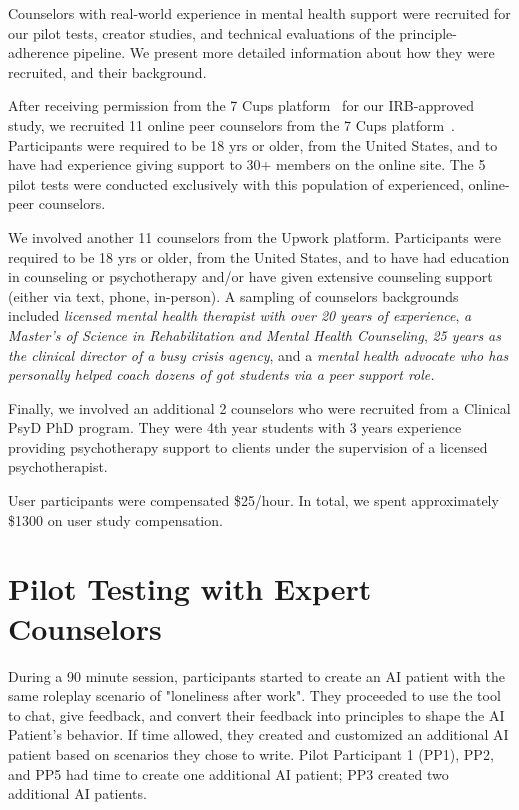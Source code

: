 \documentclass[11pt]{article}
\begin{document}
Counselors with real-world experience in mental health support were recruited for our pilot tests, creator studies, and technical evaluations of the principle-adherence pipeline. We present more detailed information about how they were recruited, and their background. 

After receiving permission from the 7 Cups platform~\cite{7cupswebsite} for our IRB-approved study, we recruited 11 online peer counselors from the 7 Cups platform~\cite{7cupswebsite}. Participants were required to be 18 yrs or older, from the United States, and to have had experience giving support to 30+ members on the online site. The 5 pilot tests were conducted exclusively with this population of experienced, online-peer counselors.

We involved another 11 counselors from the Upwork platform. Participants were required to be 18 yrs or older, from the United States, and to have had education in counseling or psychotherapy and/or have given extensive counseling support (either via text, phone, in-person). A sampling of counselors backgrounds included \textit{licensed mental health therapist with over 20 years of experience}, \textit{a Master's of Science in Rehabilitation and Mental Health Counseling}, \textit{25 years as the clinical director of a busy crisis agency}, and a \textit{mental health advocate who has personally helped coach dozens of got students via a peer support role.} 

Finally, we involved an additional 2 counselors who were recruited from a Clinical PsyD PhD program. They were 4th year students with 3 years experience providing psychotherapy support to clients under the supervision of a licensed psychotherapist. 

User participants were compensated \$25/hour. In total, we spent approximately \$1300 on user study compensation. 

\section{Pilot Testing with Expert Counselors}
\label{sec:appendix_formative}

During a 90 minute session, participants started to create an AI patient with the same roleplay scenario of "loneliness after work". They proceeded to use the tool to chat, give feedback, and convert their feedback into principles to shape the AI Patient's behavior. If time allowed, they created and customized an additional AI patient based on scenarios they chose to write. Pilot Participant 1 (PP1), PP2, and PP5 had time to create one additional AI patient; PP3 created two additional AI patients. 
\end{document}
